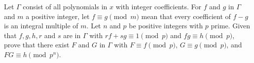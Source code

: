 Let $\Gamma$ consist of all polynomials in $x$ with integer
coefficients. For $f$ and $g$ in $\Gamma$ and $m$ a positive integer,
let $f \equiv g \pmod{m}$ mean that every coefficient of $f-g$ is an
integral multiple of $m$. Let $n$ and $p$ be positive integers with
$p$ prime. Given that $f,g,h,r$ and $s$ are in $\Gamma$ with
$rf+sg\equiv 1 \pmod{p}$ and $fg \equiv h \pmod{p}$, prove that there
exist $F$ and $G$ in $\Gamma$ with $F \equiv f \pmod{p}$, $G \equiv g
\pmod{p}$, and $FG \equiv h \pmod{p^n}$.

